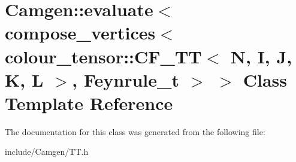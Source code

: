 \hypertarget{a00161}{\section{Camgen\-:\-:evaluate$<$ compose\-\_\-vertices$<$ colour\-\_\-tensor\-:\-:C\-F\-\_\-\-T\-T$<$ N, I, J, K, L $>$, Feynrule\-\_\-t $>$ $>$ Class Template Reference}
\label{a00161}
}


The documentation for this class was generated from the following file\-:\begin{DoxyCompactItemize}
\item 
include/\-Camgen/T\-T.\-h\end{DoxyCompactItemize}
